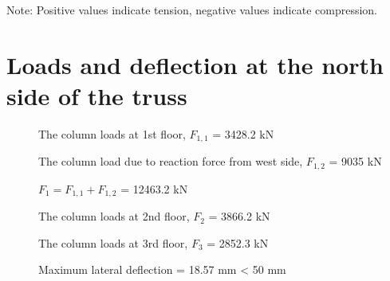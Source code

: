 \documentclass[
  letterpaper,
  DIV=11,
  numbers=noendperiod]{scrartcl}
\begin{document}
Note: Positive values indicate tension, negative values indicate
compression.

\newpage{}

\section{}\label{section-17}

\section{}\label{section-18}

\section{}\label{section-19}

\section{}\label{section-20}

\section{}\label{section-21}

\section{}\label{section-22}

\section{}\label{section-23}

\section{}\label{section-24}

\section{Loads and deflection at the north side of the
truss}\label{loads-and-deflection-at-the-north-side-of-the-truss}

\begin{description}
    \item[]The column loads at 1st floor, $F_{1,1}$ = 3428.2 kN
    \item[]The column load due to reaction force from west side, $F_{1,2}$ = 9035 kN
    \item[]$F_1 = F_{1,1} + F_{1,2}$ = 12463.2 kN
    \item[]The column loads at 2nd floor, $F_2$ = 3866.2 kN
    \item[]The column loads at 3rd floor, $F_3$ = 2852.3 kN
    \item[]Maximum lateral deflection = 18.57 mm < 50 mm
\end{description}
\end{document}
